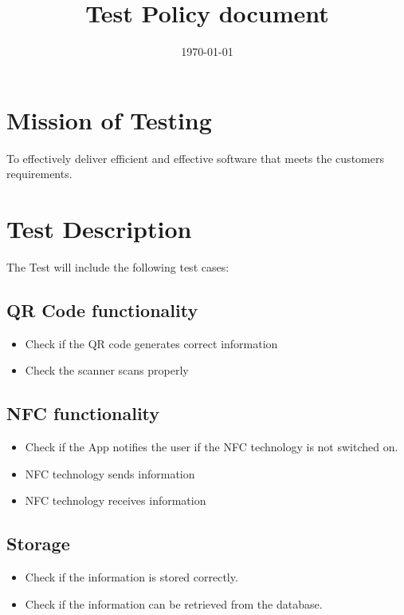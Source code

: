 \documentclass[english]{article}
\title{Test Policy document}
\date{\today}
\begin{document}
	\maketitle
	
	\newpage

	


	

	\section{Mission of Testing}
	To effectively deliver efficient and effective software that meets the customers requirements. 


	\section{Test Description}
	The Test will include the following test cases:
	
		\subsection{QR Code functionality}
		\begin{itemize} 
			\item Check if the QR code generates correct information
			\item Check the scanner scans properly 
		\end{itemize}
		
		\subsection{NFC functionality}
		\begin{itemize} 
			\item Check if the App notifies the user if the NFC technology is not switched on.
			\item NFC technology sends information
			\item NFC technology receives information
		\end{itemize}
		\subsection{Storage}
		\begin{itemize} 
			\item Check if the information is stored correctly.
			\item Check if the information can be retrieved from the database.
		\end{itemize}
		
\end{document}
